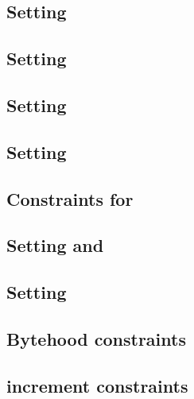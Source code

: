 \subsection{Setting \indexMax{}                            }    \label{bls: generalities: setting index max}                   %
\subsection{Setting \blsTotalSize{}                        }    \label{bls: generalities: setting total size}                  %
\subsection{Setting \blsIndex{}                            }    \label{bls: generalities: setting index}                       %
\subsection{Setting           \maxCt{}                     }    \label{bls: generalities: setting ct_max}                      %
\subsection{Constraints for \ct{}                          }    \label{bls: generalities: setting ct}                          %
\subsection{Setting \isFirstInput{} and \isSecondInput{}   }    \label{bls: generalities: setting is_first and is_second}      %
\subsection{Setting \accInputs{}                           }    \label{bls: generalities: setting acc pairings}                %
\subsection{Bytehood constraints                           }    \label{bls: generalities: bytehood and accumulator}            %
\subsection{\blsId{} increment constraints                 }    \label{bls: generalities: stamp increments}                    %
